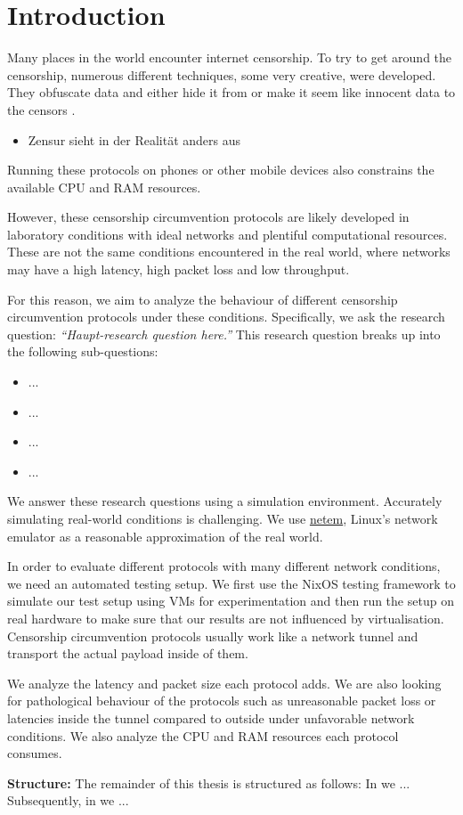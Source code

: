 
\chapter{Introduction}


Many places in the world encounter internet censorship.
To try to get around the censorship, numerous different techniques, some very creative, were developed.
They obfuscate data and either hide it from or make it seem like innocent data to the censors .

\begin{itemize}
  \item Zensur sieht in der Realität anders aus
\end{itemize}
Running these protocols on phones or other mobile devices also constrains the available CPU and RAM resources.

However, these censorship circumvention protocols are likely developed in laboratory conditions with ideal networks and plentiful computational resources.
These are not the same conditions encountered in the real world, where networks may have a high latency, high packet loss and low throughput.

For this reason, we aim to analyze the behaviour of different censorship circumvention protocols under these conditions.
Specifically, we ask the research question:
\emph{``Haupt-research question here.''}
This research question breaks up into the following sub-questions:
\begin{itemize}
  \item ...
  \item ...
  \item ...
  \item ...
\end{itemize}

We answer these research questions using a simulation environment.
Accurately simulating real-world conditions is challenging.
We use \href{https://man7.org/linux/man-pages/man8/tc-netem.8.html}{netem}, Linux's network emulator as a reasonable approximation of the real world.

In order to evaluate different protocols with many different network conditions, we need an automated testing setup.
We first use the NixOS testing framework to simulate our test setup using VMs for experimentation and then run the setup on real hardware to make sure that our results are not influenced by virtualisation.
Censorship circumvention protocols usually work like a network tunnel and transport the actual payload inside of them.

We analyze the latency and packet size each protocol adds.
We are also looking for pathological behaviour of the protocols such as unreasonable packet loss or latencies inside the tunnel compared to outside under unfavorable network conditions.
We also analyze the CPU and RAM resources each protocol consumes.

\noindent\textbf{Structure:}
The remainder of this thesis is structured as follows:
In  we ...
Subsequently, in  we ...
